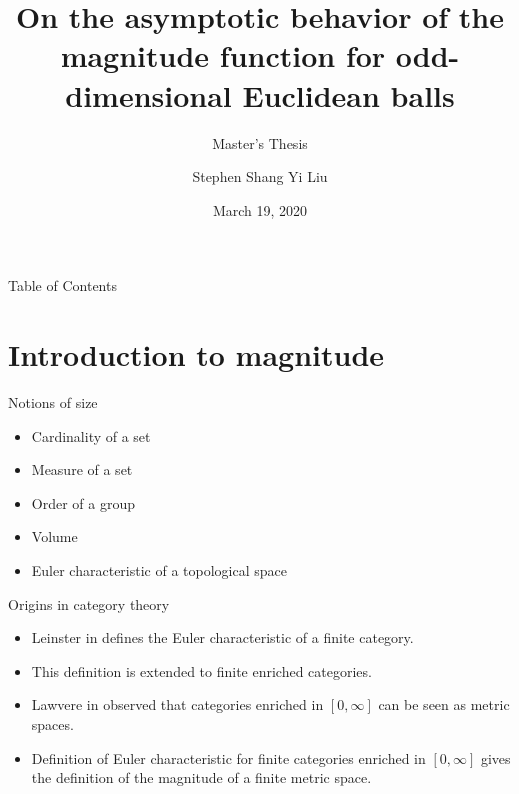 \documentclass[12pt,mathserif]{beamer}
\title[Magnitude of odd-dimensional Euclidean balls]{On the asymptotic behavior of the magnitude function for odd-dimensional Euclidean balls}
\subtitle{Master's Thesis}
\author %
{Stephen Shang Yi Liu}
\institute[CWRU] %
{Department of Mathematics, Applied Mathematics and Statistics\and
Case Western Reserve University}
\date{March 19, 2020} %
\begin{document}
\begin{frame}
  \titlepage
  \transboxin
\end{frame}

\begin{frame}{Table of Contents}
	\tableofcontents
\end{frame}

\section{Introduction to magnitude}

\begin{frame}{Notions of size}
\begin{itemize}
\item Cardinality of a set
\item Measure of a set
\item Order of a group
\item Volume
\item Euler characteristic of a topological space
\end{itemize}
\end{frame}

\begin{frame}{Origins in category theory}
\begin{itemize}
\item Leinster in \cite{leinster_euler_2006} defines the Euler characteristic of a finite category.
\item This definition is extended to finite enriched categories.
\item Lawvere in \cite{lawvere_metric_1973} observed that categories enriched in $[0,\infty]$ can be seen as metric spaces.
\item Definition of Euler characteristic for finite categories enriched in $[0,\infty]$ gives the definition of the magnitude of a finite metric space. 
\end{itemize}
\end{frame}
\end{document}
